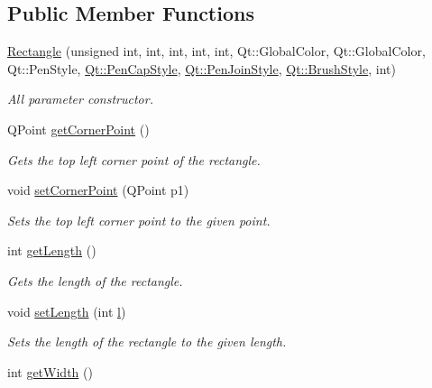 \subsection*{Public Member Functions}
\begin{DoxyCompactItemize}
\item 
\hyperlink{classRectangle_a1dca3e66dc1317df74dda6c1984728ff}{Rectangle} (unsigned int, int, int, int, int, Qt\+::\+Global\+Color, Qt\+::\+Global\+Color, Qt\+::\+Pen\+Style, \hyperlink{shape__input__file__specs_8txt_a622efdcfef6789d4367974d2fe79019e}{Qt\+::\+Pen\+Cap\+Style}, \hyperlink{shape__input__file__specs_8txt_a007db2043c6063881de2043c05c9c4a9}{Qt\+::\+Pen\+Join\+Style}, \hyperlink{shape__input__file__specs_8txt_ad07f6fe6c28dcb0b3bdc324a72d0051f}{Qt\+::\+Brush\+Style}, int)
\begin{DoxyCompactList}\small\item\em All parameter constructor. \end{DoxyCompactList}\item 
Q\+Point \hyperlink{classRectangle_a934ec26d7cff08b196e6e2db94508d5d}{get\+Corner\+Point} ()
\begin{DoxyCompactList}\small\item\em Gets the top left corner point of the rectangle. \end{DoxyCompactList}\item 
void \hyperlink{classRectangle_a34488ca08ac813751dba8c57c80985fa}{set\+Corner\+Point} (Q\+Point p1)
\begin{DoxyCompactList}\small\item\em Sets the top left corner point to the given point. \end{DoxyCompactList}\item 
int \hyperlink{classRectangle_a58c26a2910e8982b49fafd02d1d3aa47}{get\+Length} ()
\begin{DoxyCompactList}\small\item\em Gets the length of the rectangle. \end{DoxyCompactList}\item 
void \hyperlink{classRectangle_a8186780b0db41885ed04c45c9caafe96}{set\+Length} (int \hyperlink{shape__input__file__specs_8txt_a2e02238fe11bc76d2a69c565c7391545}{l})
\begin{DoxyCompactList}\small\item\em Sets the length of the rectangle to the given length. \end{DoxyCompactList}\item 
int \hyperlink{classRectangle_ab750e4f0666df9c303ad649342bf3efd}{get\+Width} ()

\end{DoxyCompactItemize}
